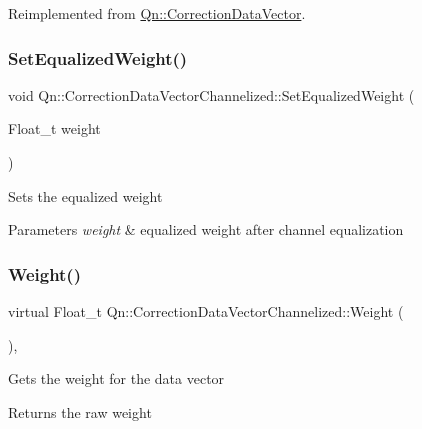 Reimplemented from \mbox{\hyperlink{classQn_1_1CorrectionDataVector_a5c4b2b16cc814104974748db21a4cab5}{Qn\+::\+Correction\+Data\+Vector}}.

\mbox{\label{classQn_1_1CorrectionDataVectorChannelized_af7f71996404eb417e7e3e006938b0fd9}} 
\subsubsection{\texorpdfstring{Set\+Equalized\+Weight()}{SetEqualizedWeight()}}
{\footnotesize\ttfamily void Qn\+::\+Correction\+Data\+Vector\+Channelized\+::\+Set\+Equalized\+Weight (\begin{DoxyParamCaption}\item[{Float\+\_\+t}]{weight }\end{DoxyParamCaption})\hspace{0.3cm}{\ttfamily [inline]}}

Sets the equalized weight 
\begin{DoxyParams}{Parameters}
{\em weight} & equalized weight after channel equalization \\
\hline
\end{DoxyParams}
\mbox{\label{classQn_1_1CorrectionDataVectorChannelized_ad1ee46c787ccf5c6537f70f6458c3872}} 
\subsubsection{\texorpdfstring{Weight()}{Weight()}}
{\footnotesize\ttfamily virtual Float\+\_\+t Qn\+::\+Correction\+Data\+Vector\+Channelized\+::\+Weight (\begin{DoxyParamCaption}{ }\end{DoxyParamCaption})\hspace{0.3cm}{\ttfamily [inline]}, {\ttfamily [virtual]}}

Gets the weight for the data vector \begin{DoxyReturn}{Returns}
the raw weight 
\end{DoxyReturn}


